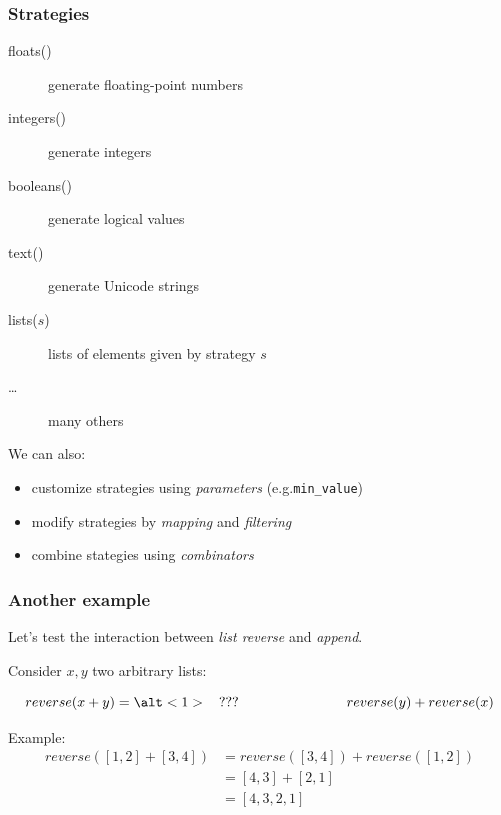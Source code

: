 \documentclass{beamer}
\begin{document}
\begin{frame}
  \frametitle{Strategies}

  \begin{description}
    \item[floats()] generate floating-point numbers
  \item[integers()] generate integers
  \item[booleans()] generate logical values 
  \item[text()] generate Unicode strings
  \item[lists($s$)] lists of elements given by strategy $s$
    \item[\ldots] many others
  \end{description}
  \bigskip
  
  We can also:
  \begin{itemize}
  \item customize strategies using \emph{parameters} (e.g.\@ \texttt{min\_value})
  \item modify strategies by \emph{mapping} and \emph{filtering}
  \item combine stategies using \emph{combinators}
  \end{itemize} 
\end{frame}


\begin{frame}
  \frametitle{Another example}

  Let's test the interaction between \emph{list reverse}
  and \emph{append}.
  
  Consider $x, y$ two arbitrary lists:

  \[  reverse(x + y) = \alt<1>{\hspace{2ex}???\hspace{18ex}}{reverse(y) + reverse(x)} \]
  \pause

  Example:
  \[\begin{array}{ll}
      reverse([1,2] + [3,4]) &= reverse([3,4]) + reverse([1,2]) \\
                             &= [4,3] + [2,1]\\
                             &= [4,3,2,1]
  \end{array}\] 
\end{frame}
\end{document}

